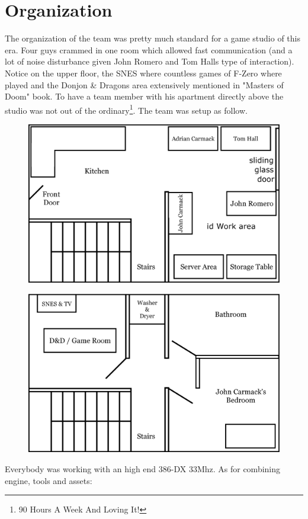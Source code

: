 \documentclass[book.tex]{subfiles}
\begin{document}
\section{Organization}
The organization of the team was pretty much standard for a game studio of this era. Four guys crammed in one room which allowed fast communication (and a lot of noise disturbance given John Romero and Tom Halls type of interaction). Notice on the upper floor, the SNES where countless games of F-Zero where played and the Donjon \& Dragons area extensively mentioned in "Masters of Doom" book. To have a team member with his apartment directly above the studio was not out of the ordinary\footnote{90 Hours A Week And Loving It!}. The team was setup as follow.
\par
\begin{figure}[H]
  \centering
  \includegraphics[width=\textwidth]{imgs/drawings/map/id-software-office-madison_bottom_floor.eps}
\end{figure}
\par
\begin{figure}[H]
  \centering
  \includegraphics[width=\textwidth]{imgs/drawings/map/id-software-office-madison_top_floor.eps}
\end{figure}
Everybody was working with an high end 386-DX 33Mhz. As for combining engine, tools and assets:\\
\end{document}

